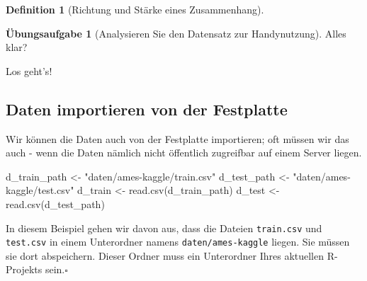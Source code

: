 \documentclass[
  a4paper,
  DIV=11]{scrreprt}
\newenvironment{Shaded}{\begin{snugshade}}{\end{snugshade}}
\newcommand{\FunctionTok}[1]{\textcolor[rgb]{0.28,0.35,0.67}{#1}}
\newcommand{\NormalTok}[1]{\textcolor[rgb]{0.00,0.23,0.31}{#1}}
\newcommand{\OtherTok}[1]{\textcolor[rgb]{0.00,0.23,0.31}{#1}}
\newcommand{\StringTok}[1]{\textcolor[rgb]{0.13,0.47,0.30}{#1}}
\theoremstyle{definition}
\newtheorem{exercise}{Übungsaufgabe}[chapter]
\theoremstyle{definition}
\theoremstyle{definition}
\newtheorem{definition}{Definition}[chapter]
\theoremstyle{remark}
\begin{document}
\begin{definition}[Richtung und Stärke eines
Zusammenhang]
\begin{exercise}[Analysieren Sie den Datensatz zur
Handynutzung]
Alles klar?

Los geht's!

\subsection{Daten importieren von der
Festplatte}\label{daten-importieren-von-der-festplatte}

Wir können die Daten auch von der Festplatte importieren; oft müssen wir
das auch - wenn die Daten nämlich nicht öffentlich zugreifbar auf einem
Server liegen.

\begin{Shaded}
\begin{Highlighting}[]
\NormalTok{d\_train\_path }\OtherTok{\textless{}{-}} \StringTok{"daten/ames{-}kaggle/train.csv"}
\NormalTok{d\_test\_path }\OtherTok{\textless{}{-}} \StringTok{"daten/ames{-}kaggle/test.csv"}
\NormalTok{d\_train }\OtherTok{\textless{}{-}} \FunctionTok{read.csv}\NormalTok{(d\_train\_path)}
\NormalTok{d\_test }\OtherTok{\textless{}{-}} \FunctionTok{read.csv}\NormalTok{(d\_test\_path)}
\end{Highlighting}
\end{Shaded}

\begin{tcolorbox}[enhanced jigsaw, leftrule=.75mm, opacitybacktitle=0.6, colback=white, colframe=quarto-callout-note-color-frame, coltitle=black, colbacktitle=quarto-callout-note-color!10!white, opacityback=0, left=2mm, breakable, titlerule=0mm, toptitle=1mm, bottomtitle=1mm, rightrule=.15mm, title=\textcolor{quarto-callout-note-color}{\faInfo}\hspace{0.5em}{Hinweis}, arc=.35mm, bottomrule=.15mm, toprule=.15mm]

In diesem Beispiel gehen wir davon aus, dass die Dateien
\texttt{train.csv} und \texttt{test.csv} in einem Unterordner namens
\texttt{daten/ames-kaggle} liegen. Sie müssen sie dort abspeichern.
Dieser Ordner muss ein Unterordner Ihres aktuellen R-Projekts
sein.\(\square\)

\end{tcolorbox}

\begin{tcolorbox}[enhanced jigsaw, leftrule=.75mm, opacitybacktitle=0.6, colback=white, colframe=quarto-callout-caution-color-frame, coltitle=black, colbacktitle=quarto-callout-caution-color!10!white, opacityback=0, left=2mm, breakable, titlerule=0mm, toptitle=1mm, bottomtitle=1mm, rightrule=.15mm, title=\textcolor{quarto-callout-caution-color}{\faFire}\hspace{0.5em}{Vorsicht}, arc=.35mm, bottomrule=.15mm, toprule=.15mm]


\end{tcolorbox}
\end{exercise}
\end{definition}
\end{document}
